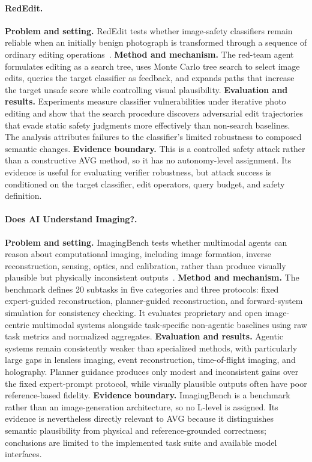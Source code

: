 \paragraph{RedEdit.}
\textbf{Problem and setting.} RedEdit tests whether image-safety classifiers remain reliable when an initially benign photograph is transformed through a sequence of ordinary editing operations~\cite{avg260606140}. \textbf{Method and mechanism.} The red-team agent formulates editing as a search tree, uses Monte Carlo tree search to select image edits, queries the target classifier as feedback, and expands paths that increase the target unsafe score while controlling visual plausibility. \textbf{Evaluation and results.} Experiments measure classifier vulnerabilities under iterative photo editing and show that the search procedure discovers adversarial edit trajectories that evade static safety judgments more effectively than non-search baselines. The analysis attributes failures to the classifier's limited robustness to composed semantic changes. \textbf{Evidence boundary.} This is a controlled safety attack rather than a constructive AVG method, so it has no autonomy-level assignment. Its evidence is useful for evaluating verifier robustness, but attack success is conditioned on the target classifier, edit operators, query budget, and safety definition.

\paragraph{Does AI Understand Imaging?.}
\textbf{Problem and setting.} ImagingBench tests whether multimodal agents can reason about computational imaging, including image formation, inverse reconstruction, sensing, optics, and calibration, rather than produce visually plausible but physically inconsistent outputs~\cite{avg260707189}. \textbf{Method and mechanism.} The benchmark defines 20 subtasks in five categories and three protocols: fixed expert-guided reconstruction, planner-guided reconstruction, and forward-system simulation for consistency checking. It evaluates proprietary and open image-centric multimodal systems alongside task-specific non-agentic baselines using raw task metrics and normalized aggregates. \textbf{Evaluation and results.} Agentic systems remain consistently weaker than specialized methods, with particularly large gaps in lensless imaging, event reconstruction, time-of-flight imaging, and holography. Planner guidance produces only modest and inconsistent gains over the fixed expert-prompt protocol, while visually plausible outputs often have poor reference-based fidelity. \textbf{Evidence boundary.} ImagingBench is a benchmark rather than an image-generation architecture, so no L-level is assigned. Its evidence is nevertheless directly relevant to AVG because it distinguishes semantic plausibility from physical and reference-grounded correctness; conclusions are limited to the implemented task suite and available model interfaces.

